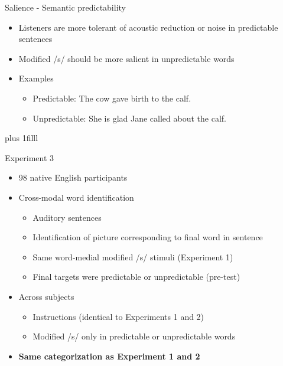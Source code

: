 \documentclass{beamer}
\newcommand{\btVFill}{\vskip0pt plus 1filll}
\begin{document}
\begin{frame}{Salience - Semantic predictability}

\begin{itemize}
\item Listeners are more tolerant of acoustic reduction or noise in predictable sentences
\item Modified /s/ should be more salient in unpredictable words
\item Examples
\begin{itemize}
\item Predictable: The cow gave birth to the calf.
\item Unpredictable: She is glad Jane called about the calf.
\end{itemize}
\end{itemize}
\btVFill
\begin{flushright}
\scriptsize
\citet{Lieberman1963, Kalikow1977, Scarborough2010}
\end{flushright}
\end{frame}

\begin{frame}{Experiment 3}

\begin{itemize}
\item 98 native English participants
\item Cross-modal word identification
\begin{itemize}
\item Auditory sentences
\item Identification of picture corresponding to final word in sentence
\item Same word-medial modified /s/ stimuli (Experiment 1)
\item Final targets were predictable or unpredictable (pre-test)
\end{itemize}
\item Across subjects
\begin{itemize}
\item Instructions (identical to Experiments 1 and 2)
\item Modified /s/ only in predictable or unpredictable words
\end{itemize}
\item \textbf{Same categorization as Experiment 1 and 2}
\end{itemize}

\end{frame}
\end{document}
